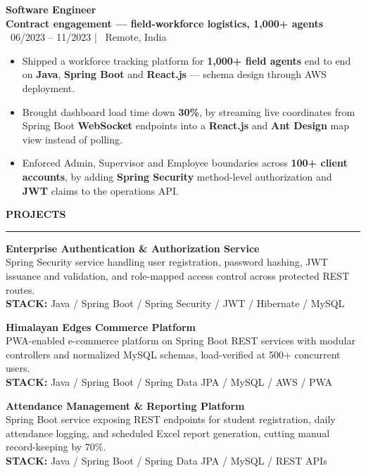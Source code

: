 \documentclass[10pt]{article}
\newcommand{\resumesection}[1]{%
  \vspace{6pt}%
  {\fontfamily{phv}\selectfont\textbf{\large\MakeUppercase{#1}}}%
  \vspace{2pt}%
  \hrule%
  \vspace{4pt}%
}
\begin{document}
\vspace{4pt}
{\textbf{Software Engineer}} \\
{\textbf{\textcolor{primaryblue}{Contract engagement --- field-workforce logistics, 1,000+ agents}}} \\
{\footnotesize\textcolor{primaryblue}{\faCalendar*}~06/2023 -- 11/2023 \quad | \quad \textcolor{primaryblue}{\faMapMarker*}~Remote, India}
\begin{itemize}
    \item Shipped a workforce tracking platform for \textbf{1,000+ field agents} end to end on \textbf{Java}, \textbf{Spring Boot} and \textbf{React.js} --- schema design through AWS deployment.
    \item Brought dashboard load time down \textbf{30\%}, by streaming live coordinates from Spring Boot \textbf{WebSocket} endpoints into a \textbf{React.js} and \textbf{Ant Design} map view instead of polling.
    \item Enforced Admin, Supervisor and Employee boundaries across \textbf{100+ client accounts}, by adding \textbf{Spring Security} method-level authorization and \textbf{JWT} claims to the operations API.
\end{itemize}

\resumesection{Projects}
{\textbf{Enterprise Authentication \& Authorization Service}} \\
{\small Spring Security service handling user registration, password hashing, JWT issuance and validation, and role-mapped access control across protected REST routes.} \\
{\footnotesize\textbf{STACK:} Java / Spring Boot / Spring Security / JWT / Hibernate / MySQL}

\vspace{4pt}
{\textbf{Himalayan Edges Commerce Platform}} \\
{\small PWA-enabled e-commerce platform on Spring Boot REST services with modular controllers and normalized MySQL schemas, load-verified at 500+ concurrent users.} \\
{\footnotesize\textbf{STACK:} Java / Spring Boot / Spring Data JPA / MySQL / AWS / PWA}

\vspace{4pt}
{\textbf{Attendance Management \& Reporting Platform}} \\
{\small Spring Boot service exposing REST endpoints for student registration, daily attendance logging, and scheduled Excel report generation, cutting manual record-keeping by 70\%.} \\
{\footnotesize\textbf{STACK:} Java / Spring Boot / Spring Data JPA / MySQL / REST APIs}
\end{document}
